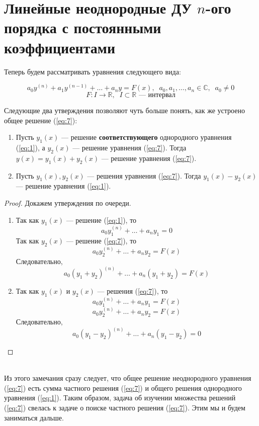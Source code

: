 \documentclass[11pt]{article}
\begin{document}
\section{Линейные неоднородные ДУ $n$-ого порядка с постоянными коэффициентами}

Теперь будем рассматривать уравнения следующего вида:

\[\tag{7} \label{eq:7} a_0 y^{(n)} + a_1 y^{(n - 1)} + \ldots + a_n y = F(x), \; \; a_0, a_1, \ldots, a_n \in \mathbb{C}, \; \; a_0 \neq 0\]
\[F \colon I \to \mathbb{R}, \; \; I \subset \mathbb{R} \text{ --- интервал}\]

\begin{remark}
    Следующие два утверждения позволяют чуть больше понять, как же устроено общее решение (\ref{eq:7}):
    \begin{enumerate}
        \item Пусть $y_1(x)$ --- решение \textbf{соответствующего} однородного уравнения (\ref{eq:1}), а $y_2(x)$ --- решение уравнения (\ref{eq:7}). Тогда $y(x) = y_1(x) + y_2(x)$ --- решение уравнения (\ref{eq:7}).
        \item Пусть $y_1(x), y_2(x)$ --- решения уравнения (\ref{eq:7}). Тогда $y_1(x) - y_2(x)$ --- решение уравнения (\ref{eq:1}).
    \end{enumerate}
\end{remark}

\begin{proof}
    Докажем утверждения по очереди.
    \begin{enumerate}
        \item Так как $y_1(x)$ --- решение (\ref{eq:1}), то 
        \[a_0 y_1^{(n)} + \ldots + a_n y_1 = 0\]
        Так как $y_2(x)$ --- решение (\ref{eq:7}), то 
        \[a_0 y_2^{(n)} + \ldots + a_n y_2 = F(x)\]
        Следовательно,
        \[a_0 (y_1 + y_2)^{(n)} + \ldots + a_n (y_1 + y_2) = F(x)\]
        \item Так как $y_1(x)$ и $y_2(x)$ --- решения (\ref{eq:7}), то 
        \[a_0 y_1^{(n)} + \ldots + a_n y_1 = F(x)\]
        \[a_0 y_2^{(n)} + \ldots + a_n y_2 = F(x)\]
        Следовательно,
        \[a_0 (y_1 - y_2)^{(n)} + \ldots + a_n (y_1 - y_2) = 0\]
    \end{enumerate}
\end{proof} \leavevmode
\\
Из этого замечания сразу следует, что общее решение неоднородного уравнения (\ref{eq:7}) есть сумма частного решения (\ref{eq:7}) и общего решения однородного уравнения (\ref{eq:1}). Таким образом, задача об изучении множества решений (\ref{eq:7}) свелась к задаче о поиске частного решения (\ref{eq:7}). Этим мы и будем заниматься дальше.
\end{document}
